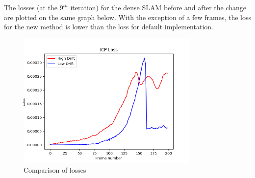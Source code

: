 \documentclass[12pt, a4paper]{article}
\begin{document}
The losses (at the $9^{th}$ iteration) for the dense SLAM before and after the change are plotted on the same graph below. With the exception of a few frames, the loss for the new method is lower than the loss for default implementation.
\begin{figure}[H]
  \centering
  \includegraphics[width=0.8\textwidth]{./results/dense_slam/bonus_loss.png}
  \caption{Comparison of losses}
\end{figure}
\end{document}
